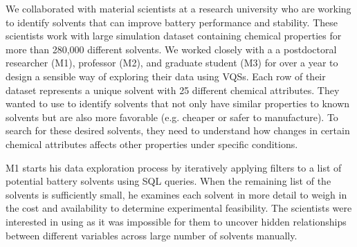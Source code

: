 \par\noindent{} We collaborated with material scientists at a research university who are working to identify solvents that can improve battery performance and stability. These scientists work with large simulation dataset containing chemical properties for more than 280,000 different solvents. We worked closely with a a postdoctoral researcher (M1), professor (M2), and graduate student (M3) for over a year to design a sensible way of exploring their data using VQSs. Each row of their dataset represents a unique solvent with 25 different chemical attributes. They wanted to use \zv to identify solvents that not only have similar properties to known solvents but are also more favorable (e.g. cheaper or safer to manufacture). To search for these desired solvents, they need to understand how changes in certain chemical attributes affects other properties under specific conditions.
\par M1 starts his data exploration process by iteratively applying filters to a list of potential battery solvents using SQL queries. When the remaining list of the solvents is sufficiently small, he examines each solvent in more detail to weigh in the cost and availability to determine experimental feasibility. The scientists were interested in using \zv as it was impossible for them to uncover hidden relationships between different variables across large number of solvents manually.%
